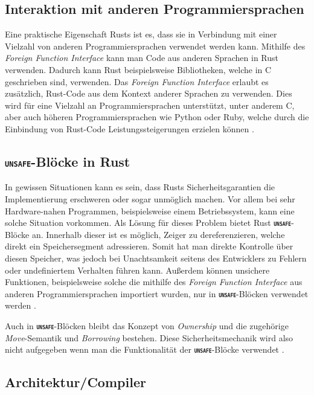 \subsection{Interaktion mit anderen Programmiersprachen}

Eine praktische Eigenschaft Rusts ist es, dass sie in Verbindung mit einer Vielzahl von anderen Programmiersprachen
verwendet werden kann. Mithilfe des \textit{Foreign Function Interface} kann man Code aus anderen
Sprachen in Rust verwenden. Dadurch kann Rust beispielsweise Bibliotheken, welche in C geschrieben sind, verwenden.
Das \textit{Foreign Function Interface} erlaubt es zusätzlich, Rust-Code aus dem Kontext anderer Sprachen zu
verwenden. Dies wird für eine Vielzahl an Programmiersprachen unterstützt, unter anderem C, aber auch höheren
Programmiersprachen wie Python oder Ruby, welche durch die Einbindung von Rust-Code Leistungssteigerungen erzielen
können \cite{firstRustBook}\cite{rustBook-1.2.0}.

\subsection{\texttt{\textsc{\textbf{unsafe}}}-Blöcke in Rust}

In gewissen Situationen kann es sein, dass Rusts Sicherheitsgarantien die Implementierung erschweren oder
sogar unmöglich machen. Vor allem bei sehr Hardware-nahen Programmen, beispielsweise einem Betriebssystem,
kann eine solche Situation vorkommen. Als Lösung für dieses Problem bietet Rust
\texttt{\textsc{\textbf{unsafe}}}-Blöcke an. Innerhalb dieser ist es möglich, Zeiger zu dereferenzieren, welche
direkt ein Speichersegment adressieren. Somit hat man direkte Kontrolle über diesen Speicher, was
jedoch bei Unachtsamkeit seitens des Entwicklers zu Fehlern oder undefiniertem Verhalten führen kann.
Außerdem können unsichere Funktionen, beispielsweise solche die mithilfe des
\textit{Foreign Function Interface} aus anderen Programmiersprachen importiert wurden,
nur in \texttt{\textsc{\textbf{unsafe}}}-Blöcken verwendet werden \cite{rustBook}.

Auch in \texttt{\textsc{\textbf{unsafe}}}-Blöcken bleibt das Konzept von \textit{Ownership} und die zugehörige
\textit{Move}-Semantik und \textit{Borrowing} bestehen. Diese Sicherheitsmechanik wird also nicht aufgegeben
wenn man die Funktionalität der \texttt{\textsc{\textbf{unsafe}}}-Blöcke verwendet \cite{rustBook}.

\subsection{Architektur/Compiler}

